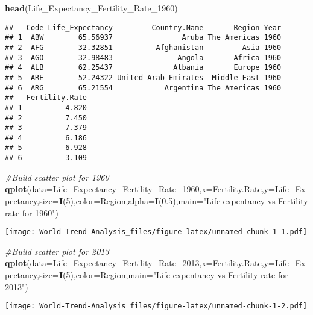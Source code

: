 \documentclass[]{article}
\newenvironment{Shaded}{\begin{snugshade}}{\end{snugshade}}
\newcommand{\CommentTok}[1]{\textcolor[rgb]{0.56,0.35,0.01}{\textit{#1}}}
\newcommand{\DataTypeTok}[1]{\textcolor[rgb]{0.13,0.29,0.53}{#1}}
\newcommand{\DecValTok}[1]{\textcolor[rgb]{0.00,0.00,0.81}{#1}}
\newcommand{\FloatTok}[1]{\textcolor[rgb]{0.00,0.00,0.81}{#1}}
\newcommand{\KeywordTok}[1]{\textcolor[rgb]{0.13,0.29,0.53}{\textbf{#1}}}
\newcommand{\NormalTok}[1]{#1}
\newcommand{\StringTok}[1]{\textcolor[rgb]{0.31,0.60,0.02}{#1}}
\begin{document}
\begin{Shaded}
\begin{Highlighting}[]
\KeywordTok{head}\NormalTok{(Life_Expectancy_Fertility_Rate_}\DecValTok{1960}\NormalTok{)}
\end{Highlighting}
\end{Shaded}

\begin{verbatim}
##   Code Life_Expectancy         Country.Name       Region Year
## 1  ABW        65.56937                Aruba The Americas 1960
## 2  AFG        32.32851          Afghanistan         Asia 1960
## 3  AGO        32.98483               Angola       Africa 1960
## 4  ALB        62.25437              Albania       Europe 1960
## 5  ARE        52.24322 United Arab Emirates  Middle East 1960
## 6  ARG        65.21554            Argentina The Americas 1960
##   Fertility.Rate
## 1          4.820
## 2          7.450
## 3          7.379
## 4          6.186
## 5          6.928
## 6          3.109
\end{verbatim}

\begin{Shaded}
\begin{Highlighting}[]
\CommentTok{#Build  scatter plot for 1960 }
\KeywordTok{qplot}\NormalTok{(}\DataTypeTok{data=}\NormalTok{Life_Expectancy_Fertility_Rate_}\DecValTok{1960}\NormalTok{,}\DataTypeTok{x=}\NormalTok{Fertility.Rate,}\DataTypeTok{y=}\NormalTok{Life_Expectancy,}\DataTypeTok{size=}\KeywordTok{I}\NormalTok{(}\DecValTok{5}\NormalTok{),}\DataTypeTok{color=}\NormalTok{Region,}\DataTypeTok{alpha=}\KeywordTok{I}\NormalTok{(}\FloatTok{0.5}\NormalTok{),}\DataTypeTok{main=}\StringTok{"Life expentancy vs Fertility rate for 1960"}\NormalTok{)}
\end{Highlighting}
\end{Shaded}

\texttt{[image: World-Trend-Analysis\_files/figure-latex/unnamed-chunk-1-1.pdf]}

\begin{Shaded}
\begin{Highlighting}[]
\CommentTok{#Build  scatter plot for 2013 }
\KeywordTok{qplot}\NormalTok{(}\DataTypeTok{data=}\NormalTok{Life_Expectancy_Fertility_Rate_}\DecValTok{2013}\NormalTok{,}\DataTypeTok{x=}\NormalTok{Fertility.Rate,}\DataTypeTok{y=}\NormalTok{Life_Expectancy,}\DataTypeTok{size=}\KeywordTok{I}\NormalTok{(}\DecValTok{5}\NormalTok{),}\DataTypeTok{color=}\NormalTok{Region,}\DataTypeTok{main=}\StringTok{"Life expentancy vs Fertility rate for 2013"}\NormalTok{)}
\end{Highlighting}
\end{Shaded}

\texttt{[image: World-Trend-Analysis\_files/figure-latex/unnamed-chunk-1-2.pdf]}
\end{document}
